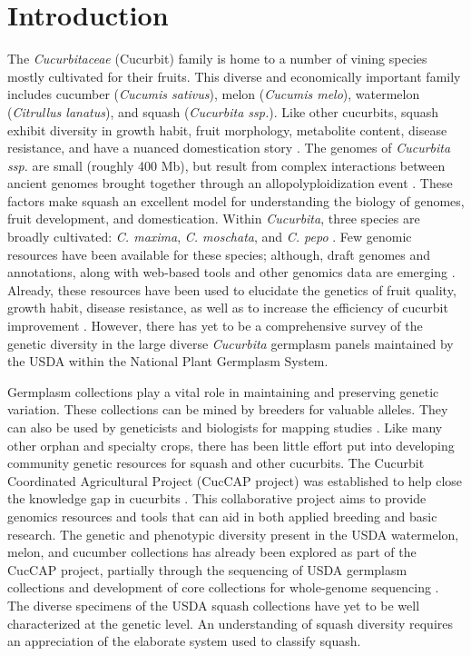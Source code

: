 \documentclass[utf8]{FrontiersinHarvard} %
\begin{document}
\section{Introduction}

The \emph{Cucurbitaceae} (Cucurbit) family is home to a number of vining species
mostly cultivated for their fruits.
This diverse and economically important family includes cucumber (\emph{Cucumis sativus}), melon (\emph{Cucumis melo}), watermelon (\emph{Citrullus lanatus}), and squash (\emph{Cucurbita ssp.})\citep{Ferriol}.
Like other cucurbits, squash exhibit diversity in growth habit, fruit morphology, metabolite content, disease resistance, and have a nuanced domestication story \citep{Chomicki2020,Paris2005}.
The genomes of \emph{Cucurbita ssp.} are small (roughly 400 Mb), but result from complex interactions between ancient genomes brought together through an allopolyploidization event \citep{Sun2017}.
These factors make squash an excellent model for understanding the biology of genomes, fruit development, and domestication.
{ \color{red} Within \emph{Cucurbita}, three species are broadly cultivated: \emph{C. maxima}, \emph{C. moschata}, and \emph{C. pepo} \citep{Ferriol}.}
Few genomic resources have been available for these species; although, draft genomes and annotations, along with web-based tools and other genomics data are emerging \citep{Yu2022}.
Already, these resources have been used to elucidate the genetics of fruit quality, growth habit, disease resistance, as well as to increase the efficiency of cucurbit improvement \citep{MonteroPau2017,Zhong2017,Kazminska2018,Wu2019,Xanthopoulou2019,Hernandez2020}. However, there has yet to be a comprehensive survey of the genetic diversity in the large diverse \emph{Cucurbita} germplasm panels maintained by the USDA within the National Plant Germplasm System.

Germplasm collections play a vital role in maintaining and preserving genetic variation.
These collections can be mined by breeders for valuable alleles. They can also be used by geneticists and biologists for mapping studies \citep{McCouch2020}.
Like many other orphan and specialty crops, there has been little effort put into developing community genetic resources for squash and other cucurbits.
The Cucurbit Coordinated Agricultural Project (CucCAP project) was established to help close the knowledge gap in cucurbits \citep{Grumet2021}.
This collaborative project aims to provide genomics resources and tools that can aid in both applied breeding and basic research.
The genetic and phenotypic diversity present in the USDA watermelon, melon, and cucumber collections has already been explored as part of the CucCAP project, partially through the sequencing of USDA germplasm collections and development of core collections for whole-genome sequencing \citep{Wang2021,Wang2018,Wu2019a}.
The diverse specimens of the USDA squash collections have yet to be well characterized at the genetic level. An understanding of squash diversity requires an appreciation of the elaborate system used to classify squash.
\end{document}
